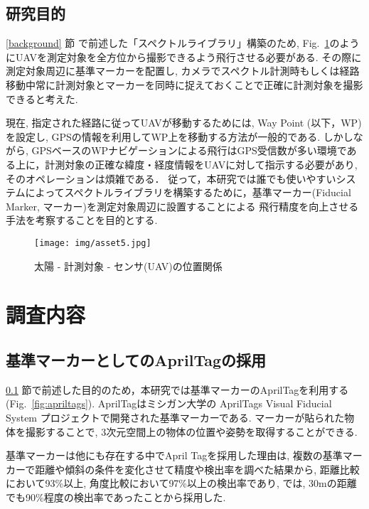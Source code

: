 \documentclass[a4j,fleqn,dvipdfmx,uplatex]{jsarticle}
\newcommand{\figref}[1]{Fig.\ \ref{#1}}
\newcommand{\subsecref}[1]{\ref{#1}\hspace{0.2zw} 節}
\begin{document}
\subsection{研究目的}\label{purpose}
\subsecref{background} で前述した「スペクトルライブラリ」構築のため, \figref{fig:spectrum}のようにUAVを測定対象を全方位から撮影できるよう飛行させる必要がある. 
その際に測定対象周辺に基準マーカーを配置し, カメラでスペクトル計測時もしくは経路移動中常に計測対象とマーカーを同時に捉えておくことで正確に計測対象を撮影できると考えた. 

現在, 指定された経路に従ってUAVが移動するためには, Way Point (以下，WP)を設定し, GPSの情報を利用してWP上を移動する方法が一般的である\cite{WP}. 
しかしながら, GPSベースのWPナビゲーションによる飛行はGPS受信数が多い環境である上に，計測対象の正確な緯度・経度情報をUAVに対して指示する必要があり, そのオペレーションは煩雑である．
従って，本研究では誰でも使いやすいシステムによってスペクトルライブラリを構築するために，基準マーカー(Fiducial Marker, マーカー)を測定対象周辺に設置することによる
飛行精度を向上させる手法を考察することを目的とする. 

\begin{figure}[tb]
    \centering
        \texttt{[image: img/asset5.jpg]}
        \caption{太陽 - 計測対象 - センサ(UAV)の位置関係}
        \label{fig:spectrum}
\end{figure}

\section{調査内容}\label{sec2}

\subsection{基準マーカーとしてのAprilTagの採用}\label{subsec:apriltag}
\subsecref{purpose}で前述した目的のため，本研究では基準マーカーのAprilTagを利用する(\figref{fig:apriltags}). 
AprilTagはミシガン大学の AprilTags Visual Fiducial System プロジェクトで開発された基準マーカーである. 
マーカーが貼られた物体を撮影することで, 3次元空間上の物体の位置や姿勢を取得することができる. 

基準マーカーは他にも存在する中でApril Tagを採用した理由は, 複数の基準マーカーで距離や傾斜の条件を変化させて精度や検出率を調べた結果から\cite{compare_tags}, 
距離比較において93\%以上, 角度比較において97\%以上の検出率であり, \cite{AprilTag2}では, 30mの距離でも90\%程度の検出率であったことから採用した.  
\end{document}
